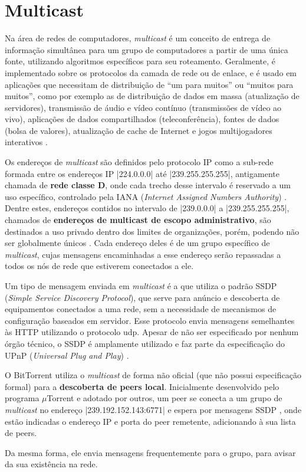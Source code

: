 
\section{Multicast}

Na área de redes de computadores, \emph{multicast} é um conceito de entrega de
informação simultânea para um grupo de computadores a partir de uma única fonte,
utilizando algoritmos específicos para seu roteamento. Geralmente, é implementado sobre
os protocolos da camada de rede ou de enlace, e é usado em aplicações que necessitam de
distribuição de ``um para muitos'' ou ``muitos para muitos'', como por exemplo as de
distribuição de dados em massa (atualização de servidores), transmissão de áudio e vídeo
contínuo (transmissões de vídeo ao vivo), aplicações de dados compartilhados
(teleconferência), fontes de dados (bolsa de valores), atualização de cache de Internet
e jogos multijogadores interativos \cite{book:kurose}.

Os endereços de \emph{multicast} são definidos pelo protocolo IP como a sub-rede formada
entre os endereços IP \sverb|224.0.0.0| até \sverb|239.255.255.255|, antigamente chamada
de \textbf{rede classe D}, onde cada trecho desse intervalo é reservado a um uso
específico, controlado pela IANA (\emph{Internet Assigned Numbers Authority})
\cite{site:iana-multicast}. Dentre estes, endereços contidos no intervalo de
\sverb|239.0.0.0| a \sverb|239.255.255.255|, chamados de
\textbf{endereços de multicast de escopo administrativo}, são destinados a uso privado
dentro dos limites de organizações, porém, podendo não ser globalmente únicos
\cite{site:rfcmulticast}. Cada endereço deles é de um grupo específico de
\emph{multicast}, cujas mensagens encaminhadas a esse endereço serão repassadas a todos
os nós de rede que estiverem conectados a ele.

Um tipo de mensagem enviada em \emph{multicast} é a que utiliza o padrão SSDP
(\emph{Simple Service Discovery Protocol}), que serve para anúncio e descoberta de
equipamentos conectados a uma rede, sem a necessidade de mecanismos de configuração
baseados em servidor. Esse protocolo envia mensagens semelhantes às HTTP utilizando o
protocolo \gls{udp}. Apesar de não ser especificado por nenhum órgão técnico, o SSDP é
amplamente utilizado e faz parte da especificação do UPnP
(\emph{Universal Plug and Play}) \cite{site:upnp}.

O BitTorrent utiliza o \emph{multicast} de forma não oficial (que não possui
especificação formal) para a \textbf{descoberta de \glspl*{peer} local}. Inicialmente
desenvolvido pelo programa $\mu$Torrent e adotado por outros, um \gls*{peer} se
conecta a um grupo de \emph{multicast} no endereço \sverb|239.192.152.143:6771| e
espera por mensagens SSDP \cite{site:utorrent-forum}, onde estão indicadas o endereço
IP e porta do \gls*{peer} remetente, adicionando à sua lista de \glspl*{peer}.


\newpage
Da mesma forma, ele envia mensagens frequentemente para o grupo, para avisar da sua
existência na rede.

